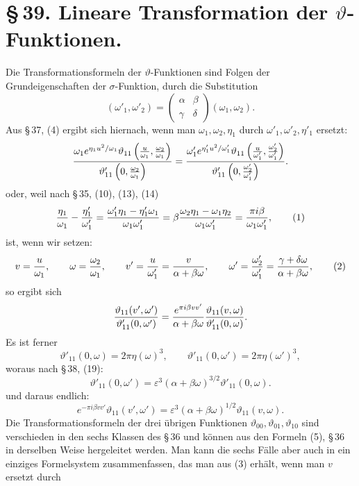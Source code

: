 \documentclass[11pt]{article}
\providecommand{\tht}{\vartheta}
\begin{document}
\section*{\S\,39. Lineare Transformation der $\vartheta$-Funktionen.}

Die Transformationsformeln der $\vartheta$-Funktionen sind Folgen der Grundeigenschaften der $\sigma$-Funktion, durch die Substitution
\[
(\omega'_1,\omega'_2)=
\begin{pmatrix}\alpha&\beta\\ \gamma&\delta\end{pmatrix}(\omega_1,\omega_2).
\]
Aus \S\,37, (4) ergibt sich hiernach, wenn man $\omega_1,\omega_2,\eta_1$ durch $\omega\prime_1,\omega\prime_2,\eta\prime_1$ ersetzt:
\[
{\omega_1 e^{\eta_1u^2/\omega_1}\tht_{11}\left({u\over\omega_1},{\omega_2\over\omega_1}\right)
\over \tht'_{11}\left(0,{\omega_2\over\omega_1}\right)}
=
{\omega'_1 e^{\eta'_1u^2/\omega'_1}\tht_{11}\left({u\over\omega'_1},{\omega'_2\over\omega'_1}\right)
\over \tht'_{11}\left(0,{\omega'_2\over\omega'_1}\right)}.
\]
oder, weil nach \S\,35, (10), (13), (14)
\begin{equation}
{\eta_1\over\omega_1}-{\eta'_1\over\omega'_1}
={\omega'_1\eta_1-\eta'_1\omega_1\over\omega_1\omega'_1}
=\beta{\omega_2\eta_1-\omega_1\eta_2\over\omega_1\omega'_1}
={\pi i\beta\over\omega_1\omega'_1},
\tag{1}
\end{equation}
ist, wenn wir setzen:
\begin{equation}
 v={u\over\omega_1},
\qquad
\omega={\omega_2\over\omega_1},
\qquad
v'={u\over\omega'_1}={v\over\alpha+
\beta\omega},
\qquad
\omega'={\omega'_2\over\omega'_1}={\gamma+\delta\omega\over\alpha+
\beta\omega},
\tag{2}
\end{equation}
so ergibt sich
\[
{\tht_{11}(v',\omega')\over\tht'_{11}(0,\omega')}
={e^{\pi i\beta vv'}
\over\alpha+
\beta\omega}
{\tht_{11}(v,\omega)\over\tht'_{11}(0,\omega)}.
\]
Es ist ferner
\[
\tht'_{11}(0,\omega)=2\pi\eta(\omega)^3,
\qquad
\tht'_{11}(0,\omega')=2\pi\eta(\omega')^3,
\]
woraus nach \S\,38, (19):
\[
\tht'_{11}(0,\omega')=\varepsilon^3(\alpha+
\beta\omega)^{3/2}\tht'_{11}(0,
\omega).
\]
und daraus endlich:
\begin{equation}
e^{-\pi i\beta vv'}\tht_{11}(v',\omega')=\varepsilon^3(\alpha+
\beta\omega)^{1/2}\tht_{11}(v,
\omega). 
\tag{3}
\end{equation}
Die Transformationsformeln der drei übrigen Funktionen $\tht_{00},\tht_{01},\tht_{10}$ sind verschieden in den sechs Klassen des \S\,36 und können aus den Formeln (5), \S\,36 in derselben Weise hergeleitet werden. Man kann die sechs Fälle aber auch in ein einziges Formelsystem zusammenfassen, das man aus (3) erhält, wenn man $v$ ersetzt durch
\end{document}
